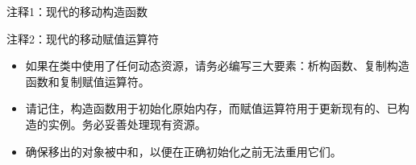 {\footnotesize
注释1：现代的移动构造函数

注释2：现代的移动赋值运算符
}


\begin{itemize}
\item
如果在类中使用了任何动态资源，请务必编写三大要素：析构函数、复制构造函数和复制赋值运算符。

\item
请记住，构造函数用于初始化原始内存，而赋值运算符用于更新现有的、已构造的实例。务必妥善处理现有资源。

\item
确保移出的对象被中和，以便在正确初始化之前无法重用它们。
\end{itemize}


















